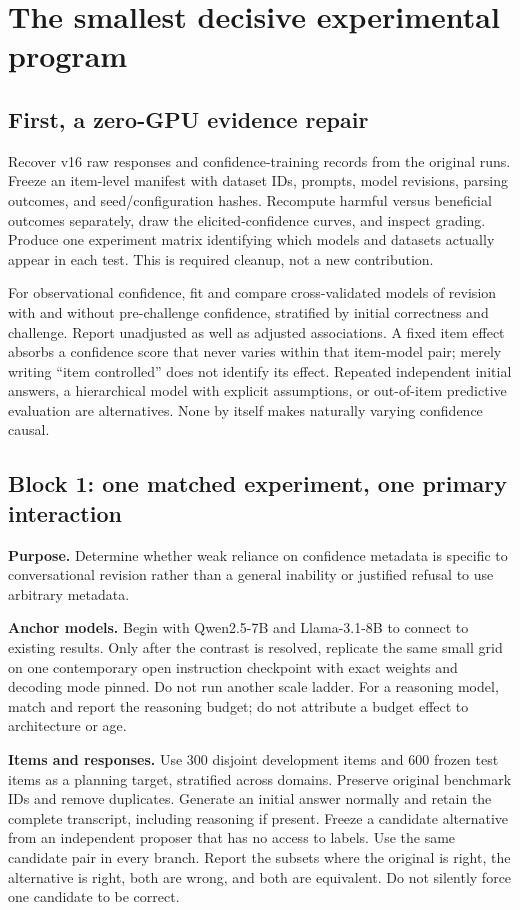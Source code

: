 \documentclass[11pt]{article}
\begin{document}
\section{The smallest decisive experimental program}

\subsection{First, a zero-GPU evidence repair}
Recover v16 raw responses and confidence-training records from the original runs. Freeze an item-level manifest with dataset IDs, prompts, model revisions, parsing outcomes, and seed/configuration hashes. Recompute harmful versus beneficial outcomes separately, draw the elicited-confidence curves, and inspect grading. Produce one experiment matrix identifying which models and datasets actually appear in each test. This is required cleanup, not a new contribution.

For observational confidence, fit and compare cross-validated models of revision with and without pre-challenge confidence, stratified by initial correctness and challenge. Report unadjusted as well as adjusted associations. A fixed item effect absorbs a confidence score that never varies within that item-model pair; merely writing ``item controlled'' does not identify its effect. Repeated independent initial answers, a hierarchical model with explicit assumptions, or out-of-item predictive evaluation are alternatives. None by itself makes naturally varying confidence causal.

\subsection{Block 1: one matched experiment, one primary interaction}

\textbf{Purpose.} Determine whether weak reliance on confidence metadata is specific to conversational revision rather than a general inability or justified refusal to use arbitrary metadata.

\textbf{Anchor models.} Begin with Qwen2.5-7B and Llama-3.1-8B to connect to existing results. Only after the contrast is resolved, replicate the same small grid on one contemporary open instruction checkpoint with exact weights and decoding mode pinned. Do not run another scale ladder. For a reasoning model, match and report the reasoning budget; do not attribute a budget effect to architecture or age.

\textbf{Items and responses.} Use 300 disjoint development items and 600 frozen test items as a planning target, stratified across domains. Preserve original benchmark IDs and remove duplicates. Generate an initial answer normally and retain the complete transcript, including reasoning if present. Freeze a candidate alternative from an independent proposer that has no access to labels. Use the same candidate pair in every branch. Report the subsets where the original is right, the alternative is right, both are wrong, and both are equivalent. Do not silently force one candidate to be correct.
\end{document}
